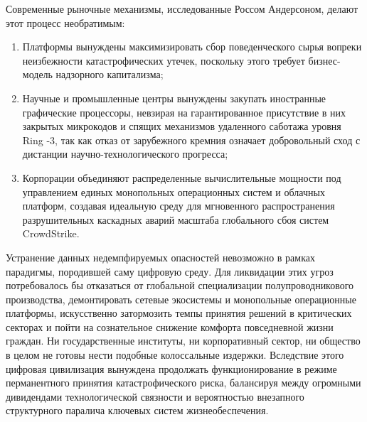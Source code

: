 \documentclass[12pt,a4paper]{article}
\begin{document}
Современные рыночные механизмы, исследованные Россом Андерсоном, делают этот процесс необратимым:
\begin{enumerate}[leftmargin=2em, itemsep=0.2em]
    \item Платформы вынуждены максимизировать сбор поведенческого сырья вопреки неизбежности катастрофических утечек, поскольку этого требует бизнес-модель надзорного капитализма;
    \item Научные и промышленные центры вынуждены закупать иностранные графические процессоры, невзирая на гарантированное присутствие в них закрытых микрокодов и спящих механизмов удаленного саботажа уровня Ring -3, так как отказ от зарубежного кремния означает добровольный сход с дистанции научно-технологического прогресса;
    \item Корпорации объединяют распределенные вычислительные мощности под управлением единых монопольных операционных систем и облачных платформ, создавая идеальную среду для мгновенного распространения разрушительных каскадных аварий масштаба глобального сбоя систем CrowdStrike.
\end{enumerate}

Устранение данных недемпфируемых опасностей невозможно в рамках парадигмы, породившей саму цифровую среду. Для ликвидации этих угроз потребовалось бы отказаться от глобальной специализации полупроводникового производства, демонтировать сетевые экосистемы и монопольные операционные платформы, искусственно затормозить темпы принятия решений в критических секторах и пойти на сознательное снижение комфорта повседневной жизни граждан. Ни государственные институты, ни корпоративный сектор, ни общество в целом не готовы нести подобные колоссальные издержки. Вследствие этого цифровая цивилизация вынуждена продолжать функционирование в режиме перманентного принятия катастрофического риска, балансируя между огромными дивидендами технологической связности и вероятностью внезапного структурного паралича ключевых систем жизнеобеспечения.
\end{document}
